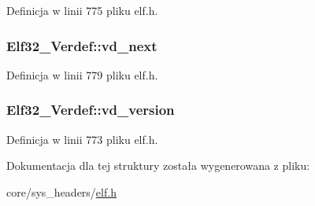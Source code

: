Definicja w linii 775 pliku elf.\-h.

\hypertarget{struct_elf32___verdef_ac919bdca49dff2f3a04b1328903edb71}{
\subsubsection[{vd\-\_\-next}]{ Elf32\-\_\-\-Verdef\-::vd\-\_\-next}}\label{struct_elf32___verdef_ac919bdca49dff2f3a04b1328903edb71}


Definicja w linii 779 pliku elf.\-h.

\hypertarget{struct_elf32___verdef_ad2f222a352ff9e2d92199811ff094822}{
\subsubsection[{vd\-\_\-version}]{ Elf32\-\_\-\-Verdef\-::vd\-\_\-version}}\label{struct_elf32___verdef_ad2f222a352ff9e2d92199811ff094822}


Definicja w linii 773 pliku elf.\-h.



Dokumentacja dla tej struktury została wygenerowana z pliku\-:\begin{DoxyCompactItemize}
\item 
core/sys\-\_\-headers/\hyperlink{elf_8h}{elf.\-h}\end{DoxyCompactItemize}
